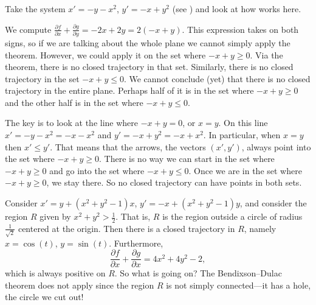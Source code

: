 \documentclass{ximera}
\begin{document}
\begin{example}
    Take the system $x'=-y-x^2$, $y'=-x+y^2$ (see ) and look at how  works here.
\end{example}
\begin{exampleSol}
    We compute $\frac{\partial f}{\partial x} + \frac{\partial g}{\partial y} = -2x + 2y=2(-x+y)$.  This expression takes on both signs, so if we are talking about the whole plane we cannot simply apply the theorem.  However, we could apply it on the set where $-x+y \geq 0$.  Via the theorem, there is no closed trajectory in that set.  Similarly, there is no closed trajectory in the set $-x+y \leq 0$.  We cannot conclude (yet) that there is no closed trajectory in the entire plane.  Perhaps half of it is in the set where $-x+y \geq 0$ and the other half is in the set where $-x+y \leq 0$.
    
    The key is to look at the line where $-x+y=0$, or $x=y$.  On this line $x' = -y-x^2 = -x-x^2$ and $y' = -x+y^2 = -x+x^2$.  In particular, when $x=y$ then $x' \leq y'$.  That means that the arrows, the vectors $(x',y')$, always point into the set where $-x+y \geq 0$.  There is no way we can start in the set where $-x+y \geq 0$ and go into the set where $-x+y \leq 0$.  Once we are in the set where $-x+y \geq 0$, we stay there.  So no closed trajectory can have points in both sets.
\end{exampleSol}

\begin{example}
    Consider $x' = y+(x^2+y^2-1)x$, $y' = -x +(x^2+y^2-1)y$, and consider the region $R$ given by $x^2+y^2 > \frac{1}{2}$.  That is, $R$ is the region outside a circle of radius $\frac{1}{\sqrt{2}}$ centered at the origin.  Then there is a closed trajectory in $R$, namely $x=\cos(t)$, $y=\sin(t)$. Furthermore,
    \begin{equation*}
        \frac{\partial f}{\partial x} + \frac{\partial g}{\partial x} = 4x^2+4y^2-2 ,
    \end{equation*}
    which is always positive on $R$.  So what is going on?  The Bendixson--Dulac theorem does not apply since the region $R$ is not simply connected---it has a hole, the circle we cut out!
\end{example}

\end{document}
